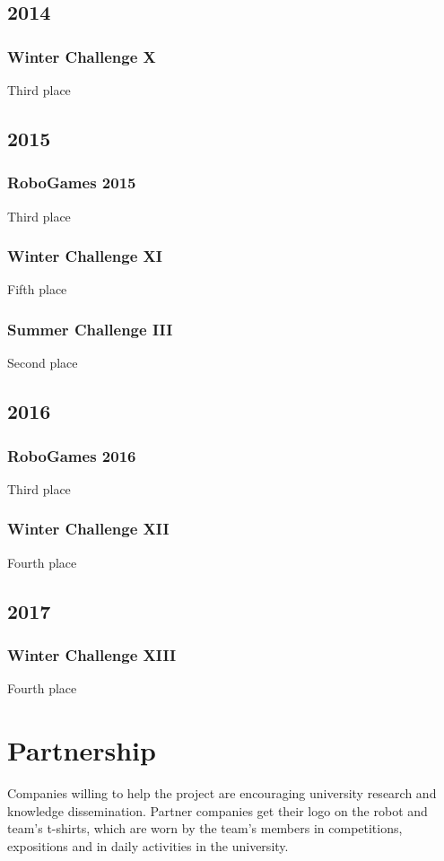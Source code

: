 \documentclass[conference]{IEEEtran}
\begin{document}
\subsection*{2014}
\setcounter{subsubsection}{0}
\subsubsection{Winter Challenge X} Third place
\subsection*{2015}
\setcounter{subsubsection}{0}
\subsubsection{RoboGames 2015} Third place
\subsubsection{Winter Challenge XI} Fifth place
\subsubsection{Summer Challenge III} Second place
\subsection*{2016}
\setcounter{subsubsection}{0}
\subsubsection{RoboGames 2016} Third place
\subsubsection{Winter Challenge XII} Fourth place
\subsection*{2017}
\setcounter{subsubsection}{0}
\subsubsection{Winter Challenge XIII} Fourth place

\section{Partnership}
Companies willing to help the project are encouraging university research and
knowledge dissemination. Partner companies get their logo on the robot and team's
t-shirts, which are worn by the team's members in competitions, expositions
and in daily activities in the university.
\end{document}
